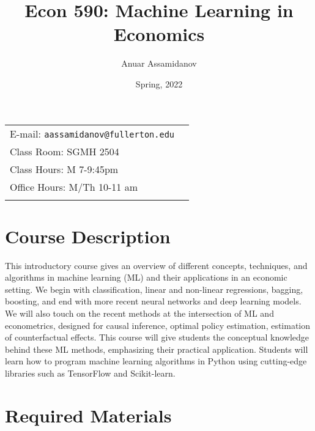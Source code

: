 \documentclass[11pt]{article}
\title{Econ 590: Machine Learning in Economics}
\author{Anuar Assamidanov}
\date{Spring, 2022}
\newcommand{\blankline}{\quad\pagebreak[2]}
\begin{document}
\maketitle

\blankline

\begin{tabular*}{.93\textwidth}{@{\extracolsep{\fill}}lr}


E-mail: \texttt{aassamidanov@fullerton.edu}  \\
Class Room: SGMH 2504 \\
Class Hours: M 7-9:45pm \\
Office Hours: M/Th 10-11 am   \\
&  \\
\hline
\end{tabular*}

\vspace{5 mm}


\section*{Course Description}

This introductory course gives an overview of different concepts, techniques, and algorithms in machine learning (ML) and their applications in an economic setting. We begin with classification, linear and non-linear regressions, bagging, boosting, and end with more recent neural networks and deep learning models. We will also touch on the recent methods at the intersection of ML and econometrics, designed for causal inference, optimal policy estimation, estimation of counterfactual effects. This course will give students the conceptual knowledge behind these ML methods, emphasizing their practical application. Students will learn how to program machine learning algorithms in Python using cutting-edge libraries such as TensorFlow and Scikit-learn.




\section*{Required Materials}
\end{document}
